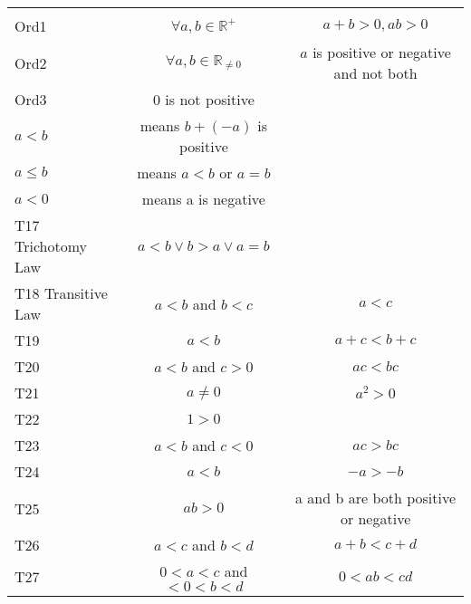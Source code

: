 \documentclass[a4paper]{article}
\theoremstyle{definition}
\begin{document}

\begin{tabular} {|l|c|c|}
  \hline & & \\
  Ord1 & $\forall a,b \in \mathbb{R}^+$ & $a + b > 0, ab > 0$\\
  Ord2 & $\forall a,b \in \mathbb{R}_{\not = 0}$ & $a$ is positive or negative and not both\\
  Ord3 & 0 is not positive & \\
  $a < b$ & means $b + (-a)$ is positive & \\
  $a \leq b$ & means $a < b$ or $a = b$ & \\
  $a < 0$ & means a is negative& \\
  T17 Trichotomy Law & $a < b \lor b > a \lor a = b$ & \\
  T18 Transitive Law & $a < b$ and $b < c$ & $a < c$\\
  T19 & $a < b$ & $a + c < b + c$ \\
  T20 & $a < b$ and $c > 0$ & $ac < bc$ \\
  T21 & $a \not = 0$ & $a^2 > 0$ \\
  T22 & $1 > 0$ &  \\
  T23 & $a < b$ and $c < 0$ & $ac > bc$ \\
  T24 & $a < b$ & $-a > -b$ \\
  T25 & $ab > 0$ & a and b are both positive or negative \\
  T26 & $a < c$ and $b < d$ & $a+b < c+d$ \\
  T27 & $0 < a < c$ and $<0 < b < d$ & $0 < ab < cd$ \\
\end{tabular}
\end{document}
